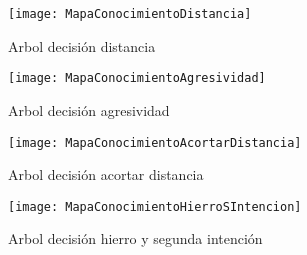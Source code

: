 \begin{figure}[htb]
  \centering
    \texttt{[image: MapaConocimientoDistancia]}
  \caption[Arbol decisión distancia]{Arbol decisión distancia}
  \label{fig:Arbol decisión distancia}
\end{figure}


\begin{figure}[htb]
  \centering
    \texttt{[image: MapaConocimientoAgresividad]}
  \caption[Arbol decisión agresividad]{Arbol decisión agresividad}
  \label{fig:Arbol decisión agresividad}
\end{figure}


\begin{figure}[htb]
  \centering
    \texttt{[image: MapaConocimientoAcortarDistancia]}
  \caption[Arbol decisión acortar distancia]{Arbol decisión acortar distancia}
  \label{fig:Arbol decisión acortar distancia}
\end{figure}


\begin{figure}[htb]
  \centering
    \texttt{[image: MapaConocimientoHierroSIntencion]}
  \caption[Arbol decisión hierro y segunda intención]{Arbol decisión hierro y segunda intención}
  \label{fig:Arbol decisión hierro y segunda intención}
\end{figure}



